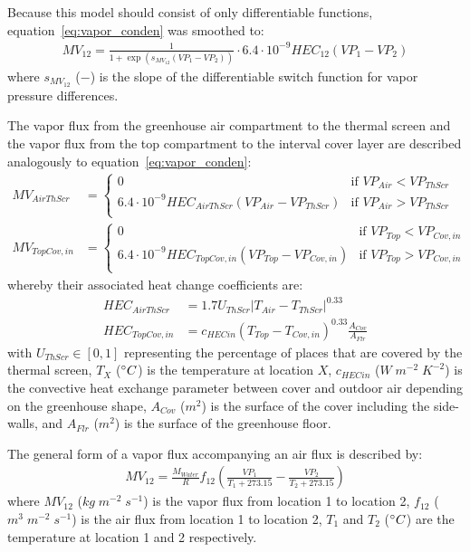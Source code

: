 \documentclass[a4paper]{article}
\begin{document}
Because this model should consist of only differentiable functions, equation~\eqref{eq:vapor_conden} was smoothed to:
\begin{align}
  MV_{12} = \frac{1}{1 + \exp \left(s_{MV_{12}} (VP_1 - VP_2)\right)} \cdot 6.4 \cdot 10^{-9} HEC_{12} (VP_1 - VP_2)
\end{align}
where \(s_{MV_{12}}\) (\(-\)) is the slope of the differentiable switch function for vapor pressure differences.

The vapor flux from the greenhouse air compartment to the thermal screen and the vapor flux from the top compartment to the interval cover layer are described analogously to equation~\eqref{eq:vapor_conden}:
\begin{align}
  MV_{AirThScr}  & = \begin{cases}
    0                                                       & \text{if~} VP_{Air} < VP_{ThScr} \\
    6.4 \cdot 10^{-9} HEC_{AirThScr}(VP_{Air} - VP_{ThScr}) & \text{if~} VP_{Air} > VP_{ThScr} \\
  \end{cases} \\
  MV_{TopCov,in} & = \begin{cases}
    0                                                         & \text{if~} VP_{Top} < VP_{Cov,in} \\
    6.4 \cdot 10^{-9} HEC_{TopCov,in}(VP_{Top} - VP_{Cov,in}) & \text{if~} VP_{Top} > VP_{Cov,in} \\
  \end{cases}
\end{align}
whereby their associated heat change coefficients are:
\begin{align}
  HEC_{AirThScr}  & = 1.7 U_{ThScr} |T_{Air} - T_{ThScr}|^{0.33}                        \\
  HEC_{TopCov,in} & = {c_{HECin} (T_{Top} - T_{Cov,in})}^{0.33} \frac{A_{Cov}}{A_{Flr}}
\end{align}
with \(U_{ThScr} \in [0,1]\) representing the percentage of places that are covered by the thermal screen, \(T_X\) (\(\degree C\)) is the temperature at location \(X\), \(c_{HECin}\) (\(W\;m^{-2}\;K^{-2}\)) is the convective heat exchange parameter between cover and outdoor air depending on the greenhouse shape, \(A_{Cov}\) (\(m^2\)) is the surface of the cover including the side-walls, and \(A_{Flr}\) (\(m^2\)) is the surface of the greenhouse floor.

The general form of a vapor flux accompanying an air flux is described by:
\begin{align}
  \label{eq:vapor_air}
  MV_{12} = \frac{M_{Water}}{R} f_{12} \left(\frac{VP_1}{T_1 + 273.15} - \frac{VP_2}{T_2 + 273.15}\right)
\end{align}
where \(MV_{12}\) (\(kg\;m^{-2}\;s^{-1}\)) is the vapor flux from location 1 to location 2, \(f_{12}\) (\(m^3\;m^{-2}\;s^{-1}\)) is the air flux from location 1 to location 2, \(T_1\) and \(T_2\) (\(\degree C\)) are the temperature at location 1 and 2 respectively.
\end{document}
